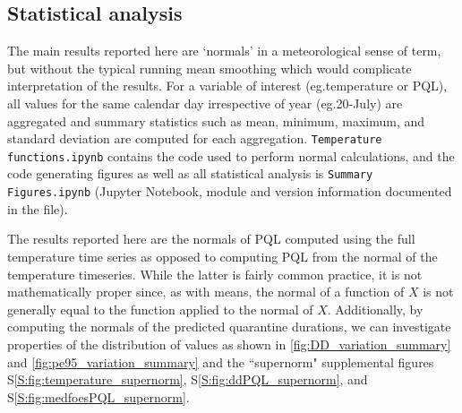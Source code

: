 \documentclass[10pt,a4paper,twocolumn]{article}
\begin{document}
\subsection*{Statistical analysis}

The main results reported here are `normals' in a meteorological sense of term,
but without the typical running mean smoothing which would complicate
interpretation of the results.
For a variable of interest (eg.\@ temperature or PQL), 
all values for the same calendar day irrespective of year (eg.\@ 20-July) are
aggregated and summary statistics such as mean, minimum, maximum, and standard deviation 
are computed for each aggregation.
\texttt{Temperature functions.ipynb} contains the code used to perform normal calculations, 
and the code generating figures as well as all statistical analysis 
is \texttt{Summary Figures.ipynb}
(Jupyter Notebook\cite{PER-GRA:2007}, module and version information documented in the file).

The results reported here are the normals of PQL computed using the full temperature time series
as opposed to computing PQL from the normal of the temperature timeseries.
While the latter is fairly common practice, it is not mathematically proper 
since, as with means, the normal of a function of $X$ is not generally equal to the function applied to the normal of $X$.
Additionally, by computing the normals of the predicted quarantine durations, 
we can investigate properties of the distribution of values as shown in 
\autoref{fig:DD_variation_summary} and \autoref{fig:pe95_variation_summary} 
and the ``supernorm" supplemental figures 
S\ref{S:fig:temperature_supernorm}, 
S\ref{S:fig:ddPQL_supernorm},
and S\ref{S:fig:medfoesPQL_supernorm}.

%
%
\end{document}
